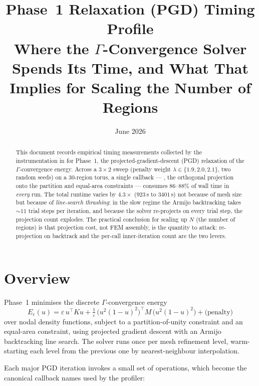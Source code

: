 \documentclass[11pt,a4paper]{article}
\title{%
  \textbf{Phase~1 Relaxation (PGD) Timing Profile}\\[0.5em]
  \large Where the $\Gamma$-Convergence Solver Spends Its Time, and What
  That Implies for Scaling the Number of Regions
}
\author{}
\date{June 2026}
\begin{document}
\maketitle

\begin{abstract}
This document records empirical timing measurements collected by the
 instrumentation in
 for Phase~1, the projected-gradient-descent
(PGD) relaxation of the $\Gamma$-convergence energy.  Across a
$3\times2$ sweep (penalty weight $\lambda \in \{1.9,2.0,2.1\}$, two
random seeds) on a 30-region torus, a single callback ---
, the orthogonal projection onto the partition and
equal-area constraints --- consumes $86$--$88\% $ of wall time in
\emph{every} run.  The total runtime varies by $4.3\times$
($923$\,s to $3401$\,s) not because of mesh size but because of
\emph{line-search thrashing}: in the slow regime the Armijo backtracking
takes $\sim\!11$ trial steps per iteration, and because the solver
re-projects on every trial step, the projection count explodes.  The
practical conclusion for scaling up $N$ (the number of regions) is that
projection cost, not FEM assembly, is the quantity to attack:
re-projection on backtrack and the per-call inner-iteration count are the
two levers.
\end{abstract}

\tableofcontents
\newpage

\section{Overview}

Phase~1 minimises the discrete $\Gamma$-convergence energy
\cite{bogosel2017partitions}
\begin{equation}
  E_\varepsilon(u)
  = \varepsilon\, u^{\!\top} K u
  + \tfrac{1}{\varepsilon}\,\big(u^2(1-u)^2\big)^{\!\top} M \,\big(u^2(1-u)^2\big)
  + \text{(penalty)}
  \label{eq:energy}
\end{equation}
over nodal density functions, subject to a partition-of-unity constraint
and an equal-area constraint, using projected gradient descent with an
Armijo backtracking line search.  The solver runs once per mesh
refinement level, warm-starting each level from the previous one by
nearest-neighbour interpolation.

Each major PGD iteration invokes a small set of operations, which become
the canonical callback names used by the profiler:
\end{document}
